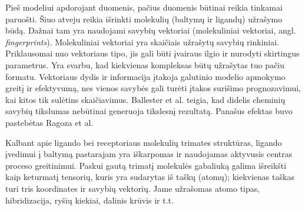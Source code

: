 Pieš modeliui apdorojant duomenis, pačius duomenis būtinai reikia tinkamai paruošti. Šiuo atveju reikia išrinkti molekulių (baltymų ir ligandų) užrašymo būdą. Dažnai tam yra naudojami savybių vektoriai (molekuliniai vektoriai, angl. \textit{fingerprints}).\cite{ballester_does_2014} Molekuliniai vektoriai yra skaičiais užrašytų savybių rinkiniai. Priklausomai nuo vektoriaus tipo, jis gali būti įvairaus ilgio ir nurodyti skirtingus parametrus. Yra svarbu, kad kiekvienas kompleksas būtų užrašytas tuo pačiu formatu. Vektoriaus dydis ir informacija įtakoja galutinio modelio apmokymo greitį ir efektyvumą, nes vienos savybės gali turėti įtakos surišimo prognozavimui, kai kitos tik sulėtins skaičiavimus. Ballester et al.\cite{ballester_does_2014} teigia, kad didelis cheminių savybių tikslumas nebūtinai generuoja tikslesnį rezultatą. Panašus efektas buvo pastebėtas Ragoza et al.\cite{ragoza_proteinligand_2017}

Kalbant apie ligando bei receptoriaus molekulių trimates struktūras, ligando įvedimui į baltymą pastarajam yra iškarpomas ir naudojamas aktyvusis centras proceso greitinimui. Paskui gautą trimatį molekulės gabaliuką galima išreikšti kaip keturmatį tensorių, kuris yra sudarytas iš taškų (atomų); kiekvienas taškas turi tris koordinates ir savybių vektorių. Jame užrašomas atomo tipas, hibridizacija, ryšių kiekiai, dalinis krūvis ir t.t.\cite{stepniewska-dziubinska_development_2018}





